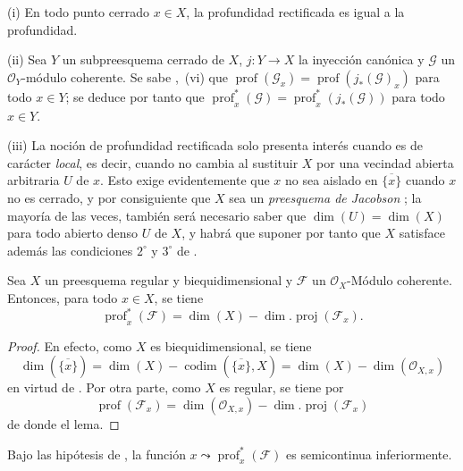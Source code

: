 \begin{remarks}[10.8.2]
\label{IV.10.8.2}
(i) En todo punto cerrado $x\in X$, la profundidad rectificada es igual a la profundidad.

(ii) Sea $Y$ un subpreesquema cerrado de $X$, $j:Y\to X$ la inyección canónica y $\mathcal G$ un $\mathcal O_Y$-módulo coherente.
Se sabe ,~(vi) que $\operatorname{prof}(\mathcal G_x)=\operatorname{prof}(j_*(\mathcal G)_x)$ para todo $x\in Y$; se deduce por tanto que $\operatorname{prof}^{*}_{x}(\mathcal G)
=\operatorname{prof}^{*}_{x}(j_*(\mathcal G))$ para todo $x\in Y$.

(iii) La noción de profundidad rectificada solo presenta interés cuando es de carácter \emph{local}, es decir, cuando no cambia al sustituir $X$ por una vecindad abierta arbitraria $U$ de $x$.
Esto exige evidentemente que $x$ no sea aislado en $\overline{\{x\}}$ cuando $x$ no es cerrado, y por consiguiente que $X$ sea un \emph{preesquema de Jacobson} ; la mayoría de las veces, también será necesario saber que $\dim(U)=\dim(X)$ para todo abierto denso $U$ de $X$, y habrá que suponer por tanto que $X$ satisface además las condiciones $2^\circ$ y $3^\circ$ de .
\end{remarks}

\begin{lemma}[10.8.3]
\label{IV.10.8.3}
Sea $X$ un preesquema regular y biequidimensional y $\mathcal F$ un $\mathcal O_X$-Módulo coherente.
Entonces, para todo $x\in X$, se tiene
\begin{equation}
\label{IV.10.8.3.1-fr}
\tag{10.8.3.1}
\operatorname{prof}^{*}_{x}(\mathcal F)
=\dim(X)-\dim.\operatorname{proj}(\mathcal F_x).
\end{equation}
\end{lemma}

\begin{proof}
En efecto, como $X$ es biequidimensional, se tiene 
\[
  \dim(\overline{\{x\}})=\dim(X)-\operatorname{codim}(\overline{\{x\}},X)
  =\dim(X)-\dim(\mathcal O_{X,x})
\]
en virtud de .
Por otra parte, como $X$ es regular, se tiene por 
\[
  \operatorname{prof}(\mathcal F_x)
  =\dim(\mathcal O_{X,x})-\dim.\operatorname{proj}(\mathcal F_x)
\]
de donde el lema.
\end{proof}

\begin{corollary}[10.8.4]
\label{IV.10.8.4}
Bajo las hipótesis de , la función $x\leadsto\operatorname{prof}^{*}_{x}(\mathcal F)$ es semicontinua inferiormente.
\end{corollary}

